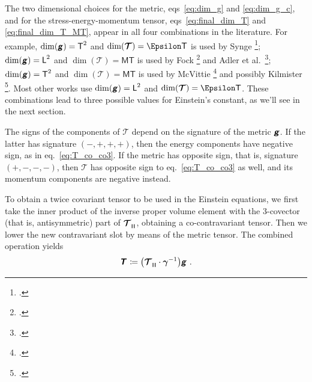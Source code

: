 \documentclass[\ifafour a4paper,12pt,\else a5paper,10pt,\fi%
onecolumn,oneside,article,%
british%
]{memoir}
\makeatletter
\theoremstyle{remark}
\theoremstyle{innote}
\newcommand*{\mathte}[1]{\textbf{\textit{\textsf{#1}}}}
\newcommand*{\citep}{\footcites}
\newcommand*{\defd}{\coloneqq}
\DeclarePairedDelimiter\abs{\lvert}{\rvert}
\renewcommand*{\|}[1][]{\nonscript\,#1\vert\nonscript\;\mathopen{}}
\newcommand*{\sect}{\S}%
\newcommand*{\sects}{\S\S}%
\newcommand*{\chaps}{chs}%
\newcommand*{\eqn}{eq.}%
\newcommand*{\eqns}{eqs}%
\newcommand*{\etal}{{et al.}}
\newcommand*{\q}{}%
\DeclareRobustCommand*{\q}{%
  \mathord{\mathpalette\bigcdot@{}}%
}
\newcommand*{\bigcdot@scalefactor}{0.7}
\newcommand*{\bigcdot@widthfactor}{1.5}
\newcommand*{\bigcdot@}[2]{%
  \sbox0{$#1\vcenter{}$}%
  \sbox2{$#1\cdot\m@th$}%
  \hbox to \bigcdot@widthfactor\wd2{%
    \hfil
    \raise\ht0\hbox{%
      \scalebox{\bigcdot@scalefactor}{%
        \lower\ht0\hbox{$#1\bullet\m@th$}%
      }%
    }%
    \hfil
  }%
}
\newcommand*{\Le}{\textsf{L}}
\newcommand*{\Ti}{\textsf{T}}
\newcommand*{\Ma}{\textsf{M}}
\newcommand*{\En}{\Epsilon}%
\newcommand*{\ii}{\cdot}
\newcommand*{\rii}{\ii}
\newcommand*{\yg}{\mathte{g}}
\newcommand*{\yT}{\bm{\mathcal{T}}}
\newcommand*{\yTc}{\Hat{\mathte{T}}}
\newcommand*{\yTe}{\mathte{T}}
\renewcommand*{\i}{\indices}
\newcommand*{\ygv}{\bm{\gamma}}
\newcommand*{\rul}{{\mkern2mu\rule[-0.1ex]{0.75pt}{1.1ex}\mkern2mu}}
\DeclarePairedDelimiter\mul{\rul}{\rul}%
\makeatother
\begin{document}
\medskip

The two dimensional choices for the metric, \eqns~\eqref{eq:dim_g} and
\eqref{eq:dim_g_c}, and for the stress-energy-momentum tensor,
\eqns~\eqref{eq:final_dim_T} and \eqref{eq:final_dim_T_MT}, appear in all
four combinations in the literature. For example, $\dim(\yg)=\Ti^{2}$ and
$\dim(\yT)=\En\Ti$ is used by Synge \citep[\sects~IV.4--5]{synge1960b};
$\dim(\yg)=\Le^{2}$ and $\dim(\yT)=\Ma\Ti$ is used by Fock
\citep[\sects~V.54--55]{fock1955_t1964} and Adler \etal\
\citep[\sect~10.1]{adleretal1965_r1975}; $\dim(\yg)=\Ti^{2}$ and
$\dim(\yT)=\Ma\Ti$ is used by McVittie
\citep[\sect~4.1]{mcvittie1956_r1965} and possibly Kilmister
\citep[\chaps~II--III; he seems to shift to natural units at some
point]{kilmister1973}. Most other works use $\dim(\yg)=\Le^{2}$ and
$\dim(\yT)=\En\Ti$. These combinations lead to three possible values for
Einstein's constant, as we'll see in the next section.

\medskip

The signs of the components of $\yT$ depend on the signature of the metric
$\yg$. If the latter has signature $(-,+,+,+)$, then the energy components
have negative sign, as in \eqn~\eqref{eq:T_co_co3}. If the metric has
opposite sign, that is, signature $(+,-,-,-)$, then $\yT$ has opposite sign
to \eqn~\eqref{eq:T_co_co3} as well, and its momentum components are
negative instead.

\medskip

To obtain a twice covariant tensor to be used in the Einstein equations, we
first take the inner product of the inverse proper volume element with the
3-covector (that is, antisymmetric) part of $\yT\i{_{\q \mul{\q\q\q}}}$,
obtaining a co-contravariant tensor. %
Then we lower the new contravariant slot by means of the metric tensor. The
combined operation yields
\begin{gather}
  \label{eq:co_co_T}
  \yTe\i{_{\q\q}} \defd
  \bigl(\yT\i{_{\q\mul{\q\q\q}}} \rii \ygv^{-1} \bigr) \yg \ .
\end{gather}
\end{document}

